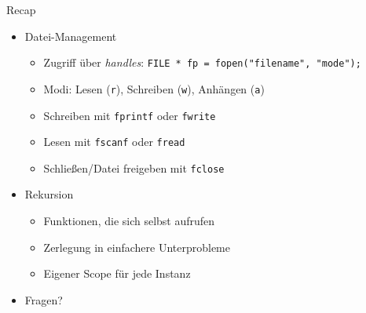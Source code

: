 
\begin{frame}[t,plain]
\titlepage
\end{frame}


\begin{frame}[fragile]{Recap}
%
\begin{itemize}
\item Datei-Management
	\begin{itemize}
	\item Zugriff über \emph{handles}:\tabto{4cm} \texttt{FILE * fp = fopen("filename", "mode");}
	\item Modi: Lesen (\texttt{r}), Schreiben (\texttt{w}), Anhängen (\texttt{a})
	\item Schreiben mit \texttt{fprintf} oder \texttt{fwrite}
	\item Lesen mit \texttt{fscanf} oder \texttt{fread}
	\item Schließen/Datei freigeben mit \texttt{fclose}
	\end{itemize}
\item Rekursion
	\begin{itemize}
	\item Funktionen, die sich selbst aufrufen
	\item Zerlegung in einfachere Unterprobleme
	\item Eigener Scope für jede Instanz
	\end{itemize}
\item Fragen?
\end{itemize}
%
\end{frame}


